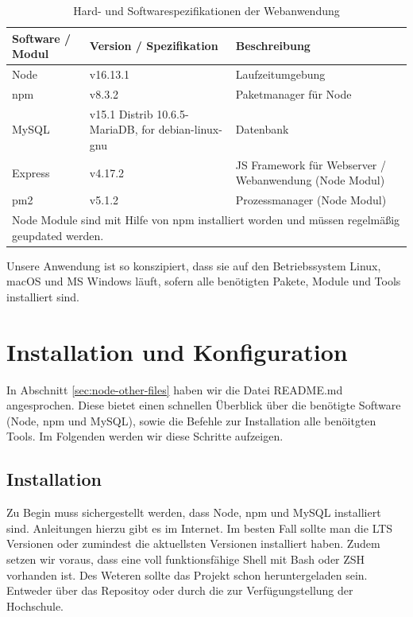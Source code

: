 \begin{table}[H]
    \caption{Hard- und Softwarespezifikationen der Webanwendung}
    \label{tab:node-specs}
    \setlength{\tabcolsep}{3pt}
    \begin{tabular}{|p{70pt}|p{120pt}|p{180pt}|}
        \hline
        Software / Modul & Version / Spezifikation                            & Beschreibung                                           \\
        \hline\hline
        Node             & v16.13.1                                           & Laufzeitumgebung                                       \\
        \hline
        npm              & v8.3.2                                             & Paketmanager für Node                                  \\
        \hline
        MySQL            & v15.1 Distrib 10.6.5-MariaDB, for debian-linux-gnu & Datenbank                                              \\
        \hline
        Express          & v4.17.2                                            & JS Framework für Webserver / Webanwendung (Node Modul) \\
        \hline
        pm2              & v5.1.2                                             & Prozessmanager (Node Modul)                            \\
        \hline
        \multicolumn{3}{p{400pt}}{Node Module sind mit Hilfe von npm installiert worden und müssen regelmäßig geupdated werden.}
    \end{tabular}
\end{table}

Unsere Anwendung ist so konszipiert, dass sie auf den Betriebssystem Linux, macOS und MS Windows läuft, sofern alle benötigten Pakete,
Module und Tools installiert sind.\\

\newpage
\section{Installation und Konfiguration}
\label{sec:nodechapter-installation}
In Abschnitt \ref{sec:node-other-files} haben wir die Datei README.md angesprochen. Diese bietet einen schnellen Überblick über
die benötigte Software (Node, npm und MySQL), sowie die Befehle zur Installation alle benöitgten Tools. Im Folgenden werden wir
diese Schritte aufzeigen.\\

\subsection*{Installation}
\label{sec:nodechapter-installation}
Zu Begin muss sichergestellt werden, dass Node, npm und MySQL installiert sind. Anleitungen hierzu gibt es im Internet. Im besten Fall
sollte man die LTS Versionen oder zumindest die aktuellsten Versionen installiert haben. Zudem setzen wir voraus, dass eine voll funktionsfähige
Shell mit Bash oder ZSH vorhanden ist. Des Weteren sollte das Projekt schon heruntergeladen sein. Entweder über das Repositoy oder
durch die zur Verfügungstellung der Hochschule.

